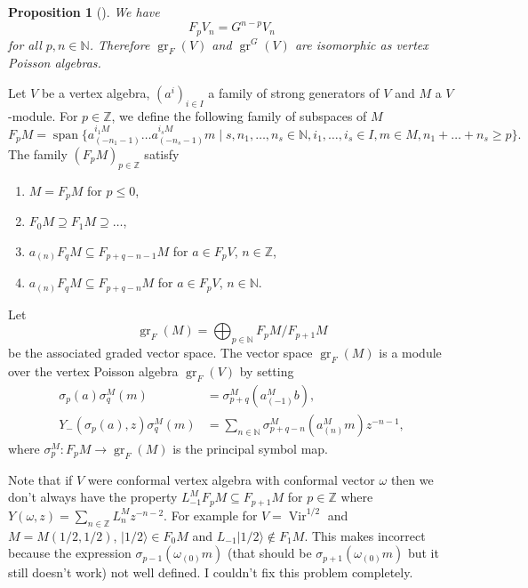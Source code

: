 \documentclass[12pt,a4paper]{article}
\newtheorem{proposition}{Proposition}
\DeclareMathOperator{\Vir}{Vir}
\DeclareMathOperator{\gr}{gr}
\DeclareMathOperator{\vspan}{span}
\newcommand{\vachalf}{|1/2\rangle}
\begin{document}
\begin{proposition}[{\cite[Proposition 2.6.1]{arakawa_remark_2012}}]
  \label{prp:3}
  We have
  \begin{equation*}
    F_pV_n=G^{n-p}V_n
  \end{equation*}
  for all $p,n\in \mathbb{N}$.
  Therefore $\gr_F(V)$ and $\gr^G(V)$ are isomorphic as vertex Poisson algebras.
\end{proposition}
Let $V$ be a vertex algebra, $(a^i)_{i\in I}$ a family of strong generators of $V$ and $M$ a $V$-module.
For $p\in \mathbb{Z}$, we define the following family of subspaces of $M$
\begin{equation*}
  F_pM=\vspan \{a^{i_1M}_{(-n_1-1)}\dots a^{i_sM}_{(-n_s-1)}m\mid s,n_1,\dots,n_s\in \mathbb{N}, i_1,\dots, i_s\in I, m\in M, n_1+\dots +n_s\ge p\}.
\end{equation*}
The family $(F_pM)_{p\in \mathbb{Z}}$ satisfy
\begin{enumerate}[label={(\alph*)}]
\item $M=F_pM$ for $p\le 0$,
\item $F_0M\supseteq F_1M\supseteq \dots$,
\item $a_{(n)}F_qM\subseteq F_{p+q-n-1}M$ for $a\in F_pV$, $n\in \mathbb{Z}$,
\item $a_{(n)}F_qM\subseteq F_{p+q-n}M$ for $a\in F_pV$, $n\in \mathbb{N}$.
\end{enumerate}

Let
\begin{equation*}
  \gr_F(M)=\bigoplus_{p\in \mathbb{N}}F_pM/F_{p+1}M
\end{equation*}
be the associated graded vector space.
The vector space $\gr_F(M)$ is a module over the vertex Poisson algebra $\gr_F(V)$ by setting
\begin{align*}
  \sigma_p(a)\sigma^M_q(m)&=\sigma^M_{p+q}(a^M_{(-1)}b), \\
  Y_-(\sigma_p(a),z)\sigma^M_q(m)&=\sum_{n\in \mathbb{N}}\sigma^M_{p+q-n}(a^M_{(n)}m)z^{-n-1},
\end{align*}
where $\sigma^M_p:F_pM\to \gr_F(M)$ is the principal symbol map.

Note that if $V$ were conformal vertex algebra with conformal vector $\omega$ then we don't always have the property $L_{-1}^MF_pM\subseteq F_{p+1}M$ for $p\in \mathbb{Z}$ where $Y(\omega,z)=\sum_{n\in \mathbb{Z}}L^M_nz^{-n-2}$.
For example for $V=\Vir^{1/2}$ and $M=M(1/2,1/2)$, $\vachalf\in F_0M$ and $L_{-1}\vachalf\notin F_1M$.
This makes \cite[Lemma 3.1.2]{arakawa_remark_2012} incorrect because the expression $\sigma_{p-1}(\omega_{(0)}m)$ (that should be $\sigma_{p+1}(\omega_{(0)}m)$ but it still doesn't work) not well defined.
I couldn't fix this problem completely.
\end{document}
